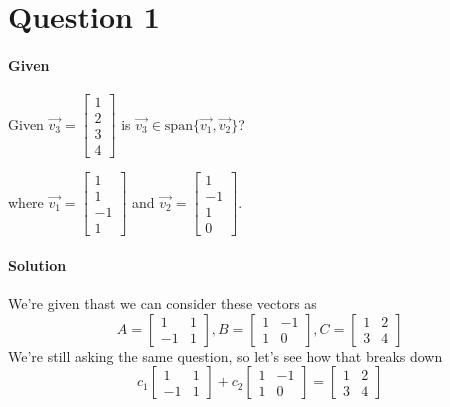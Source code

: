 \documentclass{article}
\begin{document}
    \section{Question 1}
        \paragraph{Given} 
            \begin{center}
                Given
                $\vec{v_3} = \begin{bmatrix}1\\2\\3\\4\end{bmatrix}$
                is 
                $\vec{v_3} \in \text{span}\{\vec{v_1}, \vec{v_2}\}$?
            \end{center}
            \begin{center}
                where
                $\vec{v_1} = \begin{bmatrix}1\\1\\-1\\1\end{bmatrix}$ and
                $\vec{v_2} = \begin{bmatrix}1\\-1\\1\\0\end{bmatrix}$.
            \end{center}
        \paragraph{Solution}
           We're given thast we can consider these vectors as
            \[
                A = \begin{bmatrix}1 & 1\\-1 & 1\end{bmatrix},
                B = \begin{bmatrix}1 & -1\\1 & 0\end{bmatrix},
                C = \begin{bmatrix}1 & 2\\3 & 4\end{bmatrix}
            \]
            We're still asking the same question,
            so let's see how that breaks down
            \[
                c_1\begin{bmatrix}1 & 1\\-1 & 1\end{bmatrix} +
                c_2\begin{bmatrix}1 & -1\\1 & 0\end{bmatrix} =
                \begin{bmatrix}1 & 2\\3 & 4\end{bmatrix}
            \]

                
\end{document}
